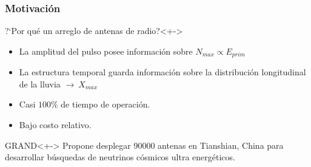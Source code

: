 \begin{frame}
 \frametitle{Motivaci\'on}
 \footnotesize

 
 \begin{block}{?`Por qu\'e un arreglo de antenas de radio?}<+->
  \begin{itemize}\setlength\itemsep{3mm}
   \item La amplitud del pulso posee informaci\'on sobre  $N_{max}\propto E_{prim}$
   \item La estructura temporal guarda informaci\'on sobre la distribuci\'on longitudinal de la lluvia $\rightarrow\ X_{max}$
   \item Casi $100\%$ de tiempo de operaci\'on.
   \item Bajo costo relativo.
  \end{itemize}
 \end{block}
 
 \begin{exampleblock}{GRAND}<+->
  Propone desplegar 90000 antenas en Tianshian, China para desarrollar b\'usquedas de neutrinos c\'osmicos ultra energ\'eticos.
 \end{exampleblock}
 
\end{frame}
